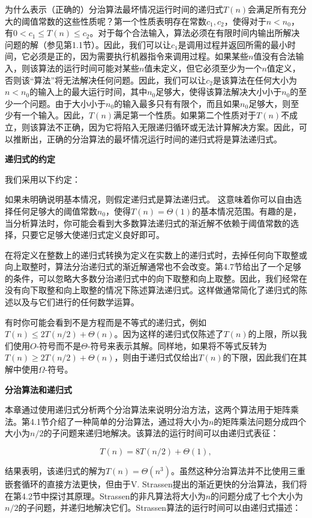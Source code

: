 \documentclass[lang=cn,newtx,10pt,scheme=chinese]{elegantbook}
\begin{document}
为什么表示（正确的）分治算法最坏情况运行时间的递归式$T(n)$会满足所有充分大的阈值常数的这些性质呢？第一个性质表明存在常数$c_1, c_2$，使得对于$n<n_0$，有$0<c_1 \leq T(n) \leq c_2$。对于每个合法输入，算法必须在有限时间内输出所解决问题的解（参见第1.1节）。因此，我们可以让$c_1$是调用过程并返回所需的最小时间，它必须是正的，因为需要执行机器指令来调用过程。如果某些$n$值没有合法输入，则该算法的运行时间可能对某些$n$值未定义，但它必须至少为一个$n$值定义，否则该“算法”将无法解决任何问题。因此，我们可以让$c_2$是该算法在任何大小为$n<n_0$的输入上的最大运行时间，其中$n_0$足够大，使得该算法解决大小小于$n_0$的至少一个问题。由于大小小于$n_0$的输入最多只有有限个，而且如果$n_0$足够大，则至少有一个输入。因此，$T(n)$满足第一个性质。如果第二个性质对于$T(n)$不成立，则该算法不正确，因为它将陷入无限递归循环或无法计算解决方案。因此，可以推断出，正确的分治算法的最坏情况运行时间的递归式将是算法递归式。

\textbf{递归式的约定}

我们采用以下约定：

如果未明确说明基本情况，则假定递归式是算法递归式。
这意味着你可以自由选择任何足够大的阈值常数$n_0$，使得$T(n)=\Theta(1)$的基本情况范围。有趣的是，当分析算法时，你可能会看到大多数算法递归式的渐近解不依赖于阈值常数的选择，只要它足够大使递归式定义良好即可。

在将定义在整数上的递归式转换为定义在实数上的递归式时，去掉任何向下取整或向上取整时，算法分治递归式的渐近解通常也不会改变。第4.7节给出了一个足够的条件，可以忽略大多数分治递归式中的向下取整和向上取整。因此，我们经常在没有向下取整和向上取整的情况下陈述算法递归式。这样做通常简化了递归式的陈述以及与它们进行的任何数学运算。

有时你可能会看到不是方程而是不等式的递归式，例如$T(n) \leq 2 T(n / 2)+\Theta(n)$。因为这样的递归式仅陈述了$T(n)$的上限，所以我们使用$O$-符号而不是$\Theta$-符号来表示其解。同样地，如果将不等式反转为$T(n) \geq 2 T(n / 2)+\Theta(n)$，则由于递归式仅给出$T(n)$的下限，因此我们在其解中使用$\Omega$-符号。

\textbf{分治算法和递归式}

本章通过使用递归式分析两个分治算法来说明分治方法，这两个算法用于矩阵乘法。第4.1节介绍了一种简单的分治算法，通过将大小为$n$的矩阵乘法问题分成四个大小为$n/2$的子问题来递归地解决。该算法的运行时间可以由递归式表征：

$$
T(n)=8 T(n / 2)+\Theta(1),
$$

结果表明，该递归式的解为$T(n)=\Theta\left(n^3\right)$。虽然这种分治算法并不比使用三重嵌套循环的直接方法更快，但由于V. Strassen提出的渐近更快的分治算法，我们将在第4.2节中探讨其原理。Strassen的非凡算法将大小为$n$的问题分成了七个大小为$n/2$的子问题，并递归地解决它们。Strassen算法的运行时间可以由递归式描述：
\end{document}
